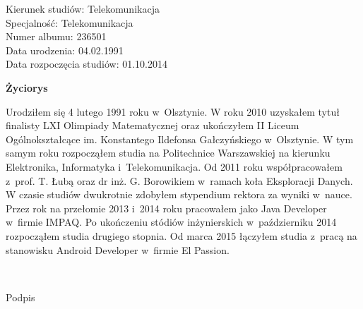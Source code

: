 	\newpage
	\thispagestyle{empty}

\begin{flushright}

  \begin{varwidth}[t]{\textwidth}
	Kierunek studiów: Telekomunikacja\\
	Specjalność: Telekomunikacja \\
	Numer albumu: 236501\\
	Data urodzenia: 04.02.1991 \\
	Data rozpoczęcia studiów: 01.10.2014 \\
  \end{varwidth}

\end{flushright}

\begin{center}
    \textbf{\textbf{Życiorys}}
\end{center}

	\vspace{0.5cm}

Urodziłem się 4 lutego 1991 roku w~Olsztynie.
W roku 2010 uzyskałem tytuł finalisty LXI Olimpiady Matematycznej oraz
ukończyłem II Liceum Ogólnokształcące im. Konstantego Ildefonsa Gałczyńskiego w~Olsztynie.
W tym samym roku rozpocząłem studia na Politechnice Warszawskiej na kierunku Elektronika, Informatyka i~Telekomunikacja.
Od 2011 roku współpracowałem z~prof. T. Łubą oraz dr inż. G. Borowikiem w~ramach koła Eksploracji Danych.
W czasie studiów dwukrotnie zdobyłem stypendium rektora za wyniki w~nauce.
Przez rok na przełomie 2013 i~2014 roku pracowałem jako Java Developer w~firmie IMPAQ.
Po ukończeniu stódiów inżynierskich w~październiku 2014 rozpocząłem studia drugiego stopnia.
Od marca 2015 łączyłem studia z~pracą na stanowisku Android Developer w~firmie El Passion.

	\vspace{1cm}

\begin{flushright}
	\begin{minipage}{5cm}
		\dotfill \\[-0.7cm]
		\begin{center}
		\small Podpis
		\end{center}
	\end{minipage}
\end{flushright}

	\vspace{2cm}
